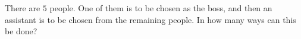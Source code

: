 There are $5$ people. One of them is to be chosen as the boss, and then an assistant is to be chosen from the remaining people. In how many ways can this be done?

